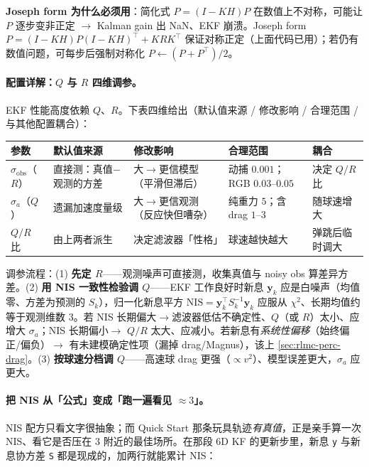 \textbf{Joseph form 为什么必须用}：简化式 $P=(I-KH)P$ 在数值上不对称，可能让 $P$ 逐步变非正定 $\to$ Kalman gain 出 NaN、EKF 崩溃。Joseph form $P=(I-KH)P(I-KH)^{\!\top}+KRK^{\!\top}$ 保证对称正定（上面代码已用）；若仍有数值问题，可每步后强制对称化 $P\leftarrow(P+P^{\!\top})/2$。

\paragraph{配置详解：$Q$ 与 $R$ 四维调参。}EKF 性能高度依赖 $Q$、$R$。下表四维给出（默认值来源 / 修改影响 / 合理范围 / 与其他配置耦合）：

\begin{center}
\small
\begin{tabular}{@{}lp{2.4cm}p{2.6cm}p{2.5cm}p{2.6cm}@{}}
\toprule
参数 & 默认值来源 & 修改影响 & 合理范围 & 耦合 \\
\midrule
$\sigma_{\text{obs}}$（$R$） & 直接测：真值$-$观测的方差 & 大$\to$更信模型（平滑但滞后） & 动捕 $0.001$；RGB $0.03$--$0.05$ & 决定 $Q/R$ 比 \\
$\sigma_a$（$Q$） & 遗漏加速度量级 & 大$\to$更信观测（反应快但嘈杂） & 纯重力 $5$；含 drag $1$--$3$ & 随球速增大 \\
$Q/R$ 比 & 由上两者派生 & 决定滤波器「性格」 & 球速越快越大 & 弹跳后临时调大 \\
\bottomrule
\end{tabular}
\end{center}

调参流程：(1) \textbf{先定 $R$}——观测噪声可直接测，收集真值与 noisy obs 算差异方差。(2) \textbf{用 NIS 一致性检验调 $Q$}——EKF 工作良好时新息 $\mathbf y_k$ 应是白噪声（均值零、方差为预测的 $S_k$），归一化新息平方 $\mathrm{NIS}=\mathbf y_k^{\!\top}S_k^{-1}\mathbf y_k$ 应服从 $\chi^2$、长期均值约等于观测维数 $3$。若 NIS 长期偏大$\to$滤波器低估不确定性、$Q$（或 $R$）太小、应增大 $\sigma_a$；NIS 长期偏小$\to$ $Q/R$ 太大、应减小。若新息有\emph{系统性偏移}（始终偏正/偏负）$\to$ 有未建模确定性项（漏掉 drag/Magnus），该上 \cref{sec:rlmc-perc-drag}。(3) \textbf{按球速分档调 $Q$}——高速球 drag 更强（$\propto v^2$）、模型误差更大，$\sigma_a$ 应更大。

\paragraph{把 NIS 从「公式」变成「跑一遍看见 $\approx 3$」。}NIS 配方只看文字很抽象；而 Quick Start 那条玩具轨迹\emph{有真值}，正是亲手算一次 NIS、看它是否压在 $3$ 附近的最佳场所。在那段 $6$D KF 的更新步里，新息 \verb|y| 与新息协方差 \verb|S| 都是现成的，加两行就能累计 NIS：

